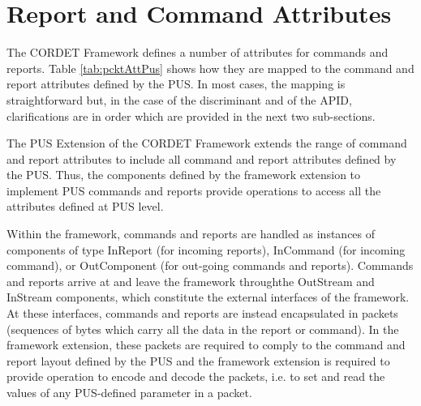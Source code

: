 \documentclass[a4paper,10pt]{article}
\let\stdsection\section
\renewcommand\section{\newpage\stdsection}
\begin{document}
\section{Report and Command Attributes}\label{sec:repCmdAttr}
The CORDET Framework defines a number of attributes for commands and reports. Table \ref{tab:pcktAttPus} shows how they are mapped to the command and report attributes defined by the PUS. In most cases, the mapping is straightforward but, in the case of the discriminant and of the APID, clarifications are in order which are provided in the next two sub-sections. 

The PUS Extension of the CORDET Framework extends the range of command and report attributes to include all command and report attributes defined by the PUS. Thus, the components defined by the framework extension to implement PUS commands and reports provide operations to access all the attributes defined at PUS level. 

Within the framework, commands and reports are handled as instances of components of type InReport (for incoming reports), InCommand (for incoming command), or OutComponent (for out-going commands and reports). Commands and reports arrive at and leave the framework throughthe OutStream and InStream components, which constitute the external interfaces of the framework. At these interfaces, commands and reports are instead encapsulated in packets (sequences of bytes which carry all the data in the report or command). In the framework extension, these packets are required to comply to the command and report layout defined by the PUS and the framework extension is required to provide operation to encode and decode the packets, i.e. to set and read the values of any PUS-defined parameter in a packet. 
\end{document}
